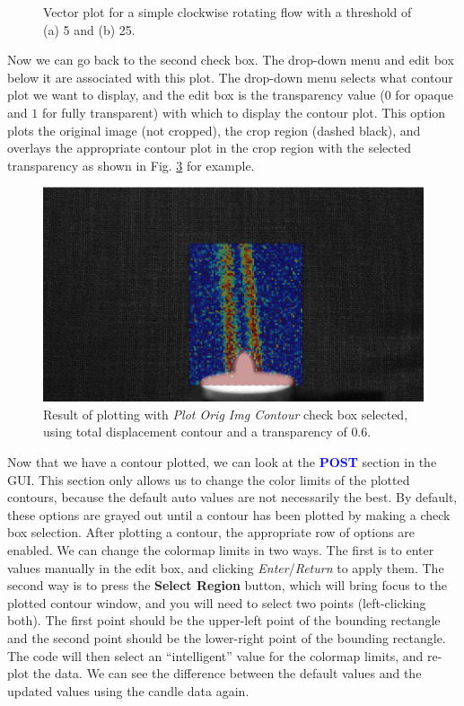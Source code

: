 \documentclass[letterpaper,12pt]{article}
\begin{document}
\begin{figure}[h]
\begin{subfigure}[b]{0.3\textwidth}
        \caption{}
        \label{fig:Plot_Total_Displacement}
    \end{subfigure}
 	
    \caption{Vector plot for a simple clockwise rotating flow with a threshold of (a) 5 and (b) 25.}
    \label{fig:Plot_Displacement}
\end{figure}

Now we can go back to the second check box.  The drop-down menu and edit box below it are associated with this plot.  The drop-down menu selects what contour plot we want to display, and the edit box is the transparency value ($0$ for opaque and $1$ for fully transparent) with which to display the contour plot.  This option plots the original image (not cropped), the crop region (dashed black), and overlays the appropriate contour plot in the crop region with the selected transparency as shown in Fig. \ref{fig:Plot_Orig_Img_Contour} for example.

\begin{figure}[h]
    \centering
    \includegraphics[width=0.75\linewidth]{Plot_Orig_Img_Contour.PNG}
    \caption{Result of plotting with \textcolor{myBlue}{\textit{Plot Orig Img Contour}} check box selected, using total displacement contour and a transparency of $0.6$.}
    \label{fig:Plot_Orig_Img_Contour}
\end{figure}

Now that we have a contour plotted, we can look at the \textcolor{blue}{\textbf{POST}} section in the GUI.  This section only allows us to change the color limits of the plotted contours, because the default auto values are not necessarily the best.  By default, these options are grayed out until a contour has been plotted by making a check box selection.  After plotting a contour, the appropriate row of options are enabled.  We can change the colormap limits in two ways.  The first is to enter values manually in the edit box, and clicking \textit{Enter}/\textit{Return} to apply them.  The second way is to press the \textcolor{myBlue}{\textbf{Select Region}} button, which will bring focus to the plotted contour window, and you will need to select two points (left-clicking both).  The first point should be the upper-left point of the bounding rectangle and the second point should be the lower-right point of the bounding rectangle.  The code will then select an ``intelligent'' value for the colormap limits, and re-plot the data.  We can see the difference between the default values and the updated values using the candle data again.
\end{document}
